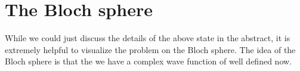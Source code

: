 \section{The Bloch sphere}

While we could just discuss the details of the above state in the abstract, it is extremely helpful to visualize the problem on the Bloch sphere. The idea of the Bloch sphere is that the we have a complex wave function of well defined now.